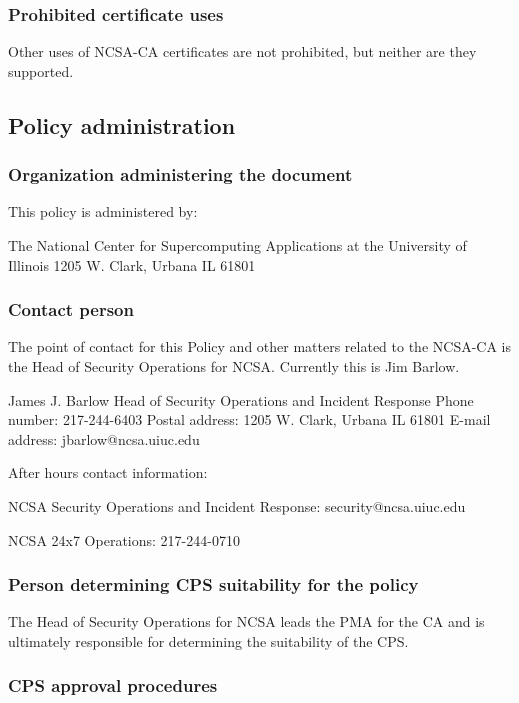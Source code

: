 \documentclass[10pt]{article}
\begin{document}
\subsubsection{Prohibited certificate uses}

Other uses of NCSA-CA certificates are not prohibited, but neither are
they supported.

\subsection{Policy administration}

\subsubsection{Organization administering the document}

This policy is administered by:

The National Center for Supercomputing Applications
at the University of Illinois
1205 W. Clark, Urbana IL 61801

\subsubsection{Contact person}

The point of contact for this Policy and other matters related to the
NCSA-CA is the Head of Security Operations for NCSA. Currently this is
Jim Barlow.

James J. Barlow
Head of Security Operations and Incident Response
Phone number: 217-244-6403
Postal address: 1205 W. Clark, Urbana IL 61801
E-mail address: jbarlow@ncsa.uiuc.edu

After hours contact information:

NCSA Security Operations and Incident Response: security@ncsa.uiuc.edu

NCSA 24x7 Operations: 217-244-0710

\subsubsection{Person determining CPS suitability for the policy}

The Head of Security Operations for NCSA leads the PMA for the CA and
is ultimately responsible for determining the suitability of the CPS.

\subsubsection{CPS approval procedures}
\end{document}
